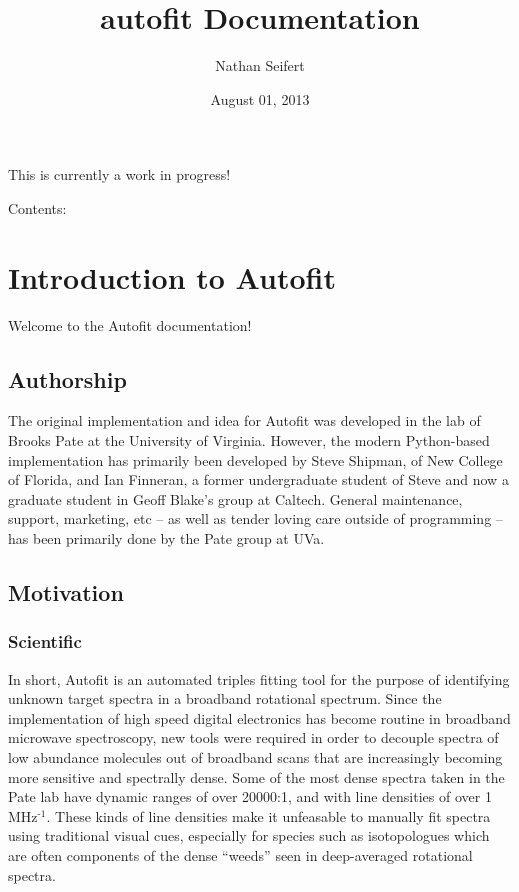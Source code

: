 \documentclass[letterpaper,10pt,english]{sphinxmanual}
\title{autofit Documentation}
\date{August 01, 2013}
\author{Nathan Seifert}
\begin{document}
\maketitle
\tableofcontents
{}\label{index::doc}


This is currently a work in progress!

Contents:


\chapter{Introduction to Autofit}
\label{intro:introduction-to-autofit}\label{intro::doc}\label{intro:autofit-an-automated-triples-fitting-program-for-broadband-rotational-spectroscopy}
Welcome to the Autofit documentation!


\section{Authorship}
\label{intro:authorship}
The original implementation and idea for Autofit was developed in the lab of Brooks Pate at the University of Virginia. However,
the modern Python-based implementation has primarily been developed by Steve Shipman, of New College of Florida, and
Ian Finneran, a former undergraduate student of Steve and now a graduate student in Geoff Blake's group at Caltech.
General maintenance, support, marketing, etc -- as well as tender loving care outside of programming -- has been primarily done by the Pate group at UVa.


\section{Motivation}
\label{intro:motivation}

\subsection{Scientific}
\label{intro:scientific}
In short, Autofit is an automated triples fitting tool for the purpose of identifying unknown target spectra in a broadband rotational spectrum.
Since the implementation of high speed digital electronics has become routine in broadband microwave spectroscopy, new tools were required in
order to decouple spectra of low abundance molecules out of broadband scans that are increasingly becoming more sensitive and spectrally dense.
Some of the most dense spectra taken in the Pate lab have dynamic ranges of over 20000:1, and with line densities of over 1 MHz$^{\text{-1}}$. These kinds of
line densities make it unfeasable to manually fit spectra using traditional visual cues, especially for species such as isotopologues which are often
components of the dense ``weeds'' seen in deep-averaged rotational spectra.
\end{document}
